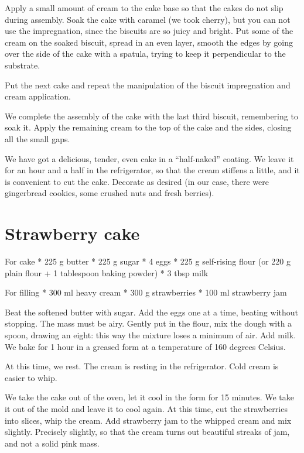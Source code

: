 \documentclass[
]{book}
\begin{document}
Apply a small amount of cream to the cake base so that the cakes do not slip during assembly. Soak the cake with caramel (we took cherry), but you can not use the impregnation, since the biscuits are so juicy and bright.
Put some of the cream on the soaked biscuit, spread in an even layer, smooth the edges by going over the side of the cake with a spatula, trying to keep it perpendicular to the substrate.

Put the next cake and repeat the manipulation of the biscuit impregnation and cream application.

We complete the assembly of the cake with the last third biscuit, remembering to soak it. Apply the remaining cream to the top of the cake and the sides, closing all the small gaps.

We have got a delicious, tender, even cake in a ``half-naked'' coating. We leave it for an hour and a half in the refrigerator, so that the cream stiffens a little, and it is convenient to cut the cake. Decorate as desired (in our case, there were gingerbread cookies, some crushed nuts and fresh berries).

\hypertarget{strawberry-cake}{%
\section{Strawberry cake}\label{strawberry-cake}}

For cake
* 225 g butter
* 225 g sugar
* 4 eggs
* 225 g self-rising flour (or 220 g plain flour + 1 tablespoon baking powder)
* 3 tbsp milk

For filling
* 300 ml heavy cream
* 300 g strawberries
* 100 ml strawberry jam

Beat the softened butter with sugar. Add the eggs one at a time, beating without stopping. The mass must be airy. Gently put in the flour, mix the dough with a spoon, drawing an eight: this way the mixture loses a minimum of air. Add milk. We bake for 1 hour in a greased form at a temperature of 160 degrees Celsius.

At this time, we rest. The cream is resting in the refrigerator. Cold cream is easier to whip.

We take the cake out of the oven, let it cool in the form for 15 minutes. We take it out of the mold and leave it to cool again. At this time, cut the strawberries into slices, whip the cream. Add strawberry jam to the whipped cream and mix slightly. Precisely slightly, so that the cream turns out beautiful streaks of jam, and not a solid pink mass.
\end{document}
